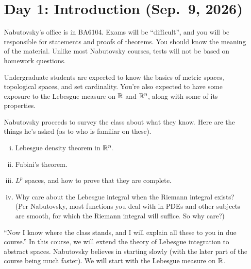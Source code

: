 \section{Day 1: Introduction (Sep.\ 9, 2026)}
Nabutovsky's office is in BA6104. Exams will be ``difficult'', and you will be responsible for statements and proofs of theorems. You should know the meaning of the material. Unlike most Nabutovsky courses, tests will not be based on homework questions.

Undergraduate students are expected to know the basics of metric spaces, topological spaces, and set cardinality. You're also expected to have some exposure to the Lebesgue measure on $\mathbb R$ and $\mathbb R^n$, along with some of its properties. 

Nabutovsky proceeds to survey the class about what they know. Here are the things he's asked (as to who is familiar on these).
\begin{enumerate}[(i)]
    \item Lebesgue density theorem in $\mathbb R^n$.
    \item Fubini's theorem.
    \item $L^p$ spaces, and how to prove that they are complete.
    \item Why care about the Lebesgue integral when the Riemann integral exists? (Per Nabutovsky, most functions you deal with in PDEs and other subjects are smooth, for which the Riemann integral will suffice. So why care?)
\end{enumerate}
``Now I know where the class stands, and I will explain all these to you in due course.'' In this course, we will extend the theory of Lebesgue integration to abstract spaces. Nabutovsky believes in starting slowly (with the later part of the course being much faster). We will start with the Lebesgue measure on $\mathbb R$.

